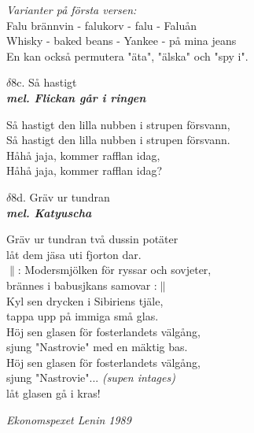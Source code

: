 \documentclass[a6paper,10pt]{article}
\newcommand{\mel}[1]{\small\textbf{\textit{mel. #1 \\}}}
\begin{document}
\newpage
\setlength{\oddsidemargin}{-0.37in}
\noindent
\textit{Varianter på första versen:}
\vspace{5pt}\\
Falu brännvin - falukorv - falu - Faluån
\vspace{5pt}\\
Whisky - baked beans - Yankee - på mina jeans
\vspace{5pt}\\
En kan också permutera "äta", "älska" och "spy i".
\vspace{10pt}
\begin{center}
\Large $\delta8$c. Så hastigt\\ 
\mel{Flickan går i ringen}
\end{center}
Så hastigt den lilla nubben i strupen försvann, \\
Så hastigt den lilla nubben i strupen försvann. \\
Håhå jaja, kommer rafflan idag, \\
Håhå jaja, kommer rafflan idag? 
\vspace{10pt}
\begin{center}
\Large $\delta8$d. Gräv ur tundran\\ 
\mel{Katyuscha}
\end{center}
Gräv ur tundran två dussin potäter \\
låt dem jäsa uti fjorton dar. \\
$\|$: Modersmjölken för ryssar och sovjeter, \\
brännes i babusjkans samovar :$\|$
\vspace{5pt}\\
Kyl sen drycken i Sibiriens tjäle, \\
tappa upp på immiga små glas. \\
Höj sen glasen för fosterlandets välgång, \\
sjung "Nastrovie" med en mäktig bas. \\
Höj sen glasen för fosterlandets välgång, \\
sjung "Nastrovie"... \textit{(supen intages) \\}
låt glasen gå i kras! 
\begin{flushright}
\textit{Ekonomspexet Lenin 1989}
\end{flushright}
\end{document}
